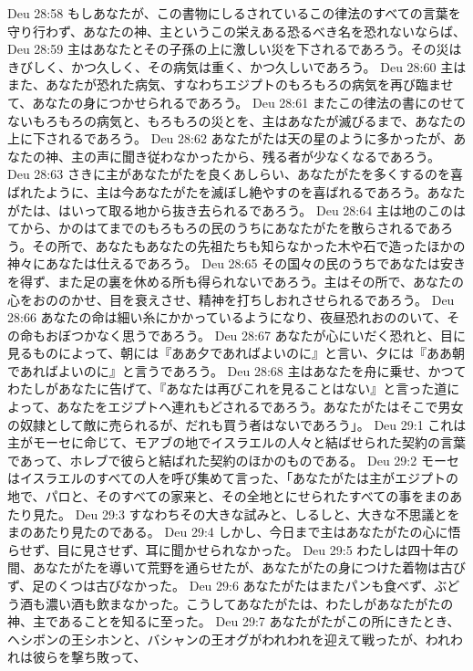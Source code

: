Deu 28:58  もしあなたが、この書物にしるされているこの律法のすべての言葉を守り行わず、あなたの神、主というこの栄えある恐るべき名を恐れないならば、
Deu 28:59  主はあなたとその子孫の上に激しい災を下されるであろう。その災はきびしく、かつ久しく、その病気は重く、かつ久しいであろう。
Deu 28:60  主はまた、あなたが恐れた病気、すなわちエジプトのもろもろの病気を再び臨ませて、あなたの身につかせられるであろう。
Deu 28:61  またこの律法の書にのせてないもろもろの病気と、もろもろの災とを、主はあなたが滅びるまで、あなたの上に下されるであろう。
Deu 28:62  あなたがたは天の星のように多かったが、あなたの神、主の声に聞き従わなかったから、残る者が少なくなるであろう。
Deu 28:63  さきに主があなたがたを良くあしらい、あなたがたを多くするのを喜ばれたように、主は今あなたがたを滅ぼし絶やすのを喜ばれるであろう。あなたがたは、はいって取る地から抜き去られるであろう。
Deu 28:64  主は地のこのはてから、かのはてまでのもろもろの民のうちにあなたがたを散らされるであろう。その所で、あなたもあなたの先祖たちも知らなかった木や石で造ったほかの神々にあなたは仕えるであろう。
Deu 28:65  その国々の民のうちであなたは安きを得ず、また足の裏を休める所も得られないであろう。主はその所で、あなたの心をおののかせ、目を衰えさせ、精神を打ちしおれさせられるであろう。
Deu 28:66  あなたの命は細い糸にかかっているようになり、夜昼恐れおののいて、その命もおぼつかなく思うであろう。
Deu 28:67  あなたが心にいだく恐れと、目に見るものによって、朝には『ああ夕であればよいのに』と言い、夕には『ああ朝であればよいのに』と言うであろう。
Deu 28:68  主はあなたを舟に乗せ、かつてわたしがあなたに告げて、『あなたは再びこれを見ることはない』と言った道によって、あなたをエジプトへ連れもどされるであろう。あなたがたはそこで男女の奴隷として敵に売られるが、だれも買う者はないであろう」。
Deu 29:1  これは主がモーセに命じて、モアブの地でイスラエルの人々と結ばせられた契約の言葉であって、ホレブで彼らと結ばれた契約のほかのものである。
Deu 29:2  モーセはイスラエルのすべての人を呼び集めて言った、「あなたがたは主がエジプトの地で、パロと、そのすべての家来と、その全地とにせられたすべての事をまのあたり見た。
Deu 29:3  すなわちその大きな試みと、しるしと、大きな不思議とをまのあたり見たのである。
Deu 29:4  しかし、今日まで主はあなたがたの心に悟らせず、目に見させず、耳に聞かせられなかった。
Deu 29:5  わたしは四十年の間、あなたがたを導いて荒野を通らせたが、あなたがたの身につけた着物は古びず、足のくつは古びなかった。
Deu 29:6  あなたがたはまたパンも食べず、ぶどう酒も濃い酒も飲まなかった。こうしてあなたがたは、わたしがあなたがたの神、主であることを知るに至った。
Deu 29:7  あなたがたがこの所にきたとき、ヘシボンの王シホンと、バシャンの王オグがわれわれを迎えて戦ったが、われわれは彼らを撃ち敗って、
